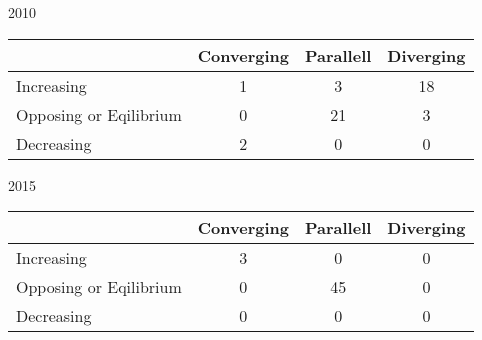 \begin{table}
\caption{Patterns of Change in Prescriptiveness among U.S. Forestry Certification Programs on 48 Key Issues}
\label{patterns-2010-2015}
\small\sf\centering
\raggedright

2010

\begin{longtable*}[]{@{}lccc@{}}
\toprule
& Converging & Parallell & Diverging\tabularnewline
\midrule
\endhead
Increasing & 1 & 3 & 18\tabularnewline
Opposing or Eqilibrium & 0 & 21 & 3\tabularnewline
Decreasing & 2 & 0 & 0\tabularnewline
\bottomrule
\end{longtable*}

2015

\begin{longtable*}[]{@{}lccc@{}}
\toprule
& Converging & Parallell & Diverging\tabularnewline
\midrule
\endhead
Increasing & 3 & 0 & 0\tabularnewline
Opposing or Eqilibrium & 0 & 45 & 0\tabularnewline
Decreasing & 0 & 0 & 0\tabularnewline
\bottomrule
\end{longtable*}

\end{table}